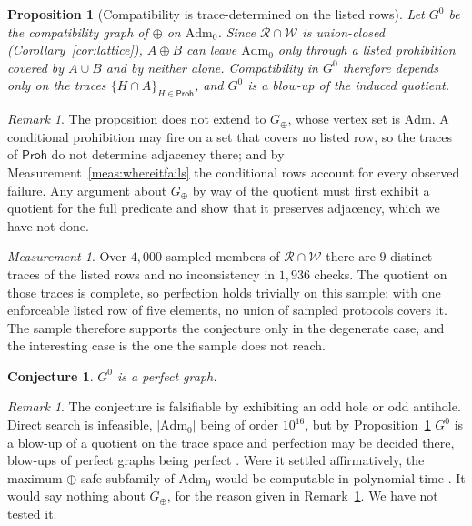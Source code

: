 \documentclass[11pt,reqno]{amsart}
\theoremstyle{plain}
\newtheorem{proposition}[theorem]{Proposition}
\newtheorem{conjecture}[theorem]{Conjecture}
\theoremstyle{definition}
\theoremstyle{remark}
\newtheorem{measurement}[theorem]{Measurement}
\newtheorem{remark}[theorem]{Remark}
\newcommand{\Adm}{\mathrm{Adm}_{0}}
\newcommand{\Admf}{\mathrm{Adm}}
\newcommand{\Haz}{\mathsf{Proh}}
\begin{document}
\begin{proposition}[Compatibility is trace-determined on the listed rows]\label{prop:trace}
Let $G^{0}$ be the compatibility graph of $\oplus$ on $\Adm$. Since
$\mathcal{R} \cap \mathcal{W}$ is union-closed (Corollary~\ref{cor:lattice}),
$A \oplus B$ can leave $\Adm$ only through a listed prohibition covered by
$A \cup B$ and by neither alone. Compatibility in $G^{0}$ therefore depends only
on the traces $\{H \cap A\}_{H \in \Haz}$, and $G^{0}$ is a blow-up of the
induced quotient.
\end{proposition}

\begin{remark}\label{rem:tracelimit}
The proposition does not extend to $G_\oplus$, whose vertex set is $\Admf$. A
conditional prohibition may fire on a set that covers no listed row, so the
traces of $\Haz$ do not determine adjacency there; and by
Measurement~\ref{meas:whereitfails} the conditional rows account for every
observed failure. Any argument about $G_\oplus$ by way of the quotient must
first exhibit a quotient for the full predicate and show that it preserves
adjacency, which we have not done.
\end{remark}

\begin{measurement}
Over $4{,}000$ sampled members of $\mathcal{R} \cap \mathcal{W}$ there are $9$
distinct traces of the listed rows and no inconsistency in $1{,}936$ checks. The
quotient on those traces is complete, so perfection holds trivially on this
sample: with one enforceable listed row of five elements, no union of sampled
protocols covers it. The sample therefore supports the conjecture only in the
degenerate case, and the interesting case is the one the sample does not
reach.
\end{measurement}

\begin{conjecture}\label{conj:perfect}
$G^{0}$ is a perfect graph.
\end{conjecture}

\begin{remark}
The conjecture is falsifiable by exhibiting an odd hole or odd antihole. Direct
search is infeasible, $|\Adm|$ being of order $10^{16}$, but by
Proposition~\ref{prop:trace} $G^{0}$ is a blow-up of a quotient on the trace
space and perfection may be decided there, blow-ups of perfect graphs being
perfect \cite{lovasz1972}. Were it settled affirmatively, the maximum
$\oplus$-safe subfamily of $\Adm$ would be computable in polynomial time
\cite{gls1981}. It would say nothing about $G_\oplus$, for the reason given in
Remark~\ref{rem:tracelimit}. We have not tested it.
\end{remark}
\end{document}
